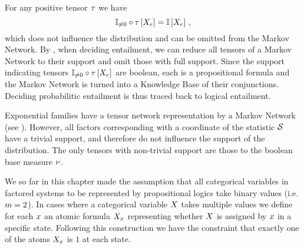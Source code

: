For any positive tensor $\tau$ we have
\[ \mathbb{I}_{\neq0}\circ\tau\left[X_{e}\right] = \mathbb{I}\left[X_{e}\right] \, , \]
which does not influence the distribution and can be omitted from the Markov Network.
By , when deciding entailment, we can reduce all tensors of a Markov Network to their support and omit those with full support.
Since the support indicating tensors $\mathbb{I}_{\neq0}\circ\tau\left[X_{e}\right]$ are boolean, each is a propositional formula and the Markov Network is turned into a Knowledge Base of their conjunctions.
Deciding probabilitic entailment is thus traced back to logical entailment.

Exponential families have a tensor network representation by a Markov Network (see ).
However, all factors corresponding with a coordinate of the statistic $\mathcal{S}$ have a trivial support, and therefore do not influence the support of the distribution.
The only tensors with non-trivial support are those to the boolean base measure $\nu$.


\label{sec:categoricalTN}

We so far in this chapter made the assumption that all categorical variables in factored systems to be represented by propositional logics take binary values (i.e. $m=2$).
In cases where a categorical variable $X$ takes multiple values we define for each $x$ an atomic formula $X_{x}$ representing whether $X$ is assigned by $x$ in a specific state.
Following this construction we have the constraint that exactly one of the atoms $X_{x}$ is $1$ at each state.



